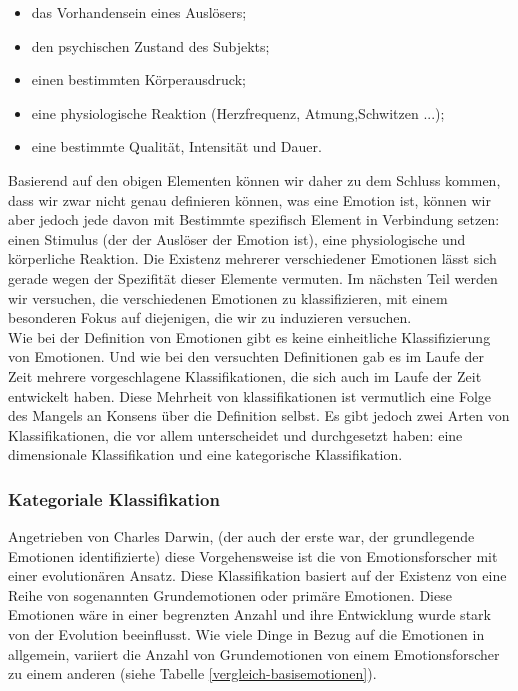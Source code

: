 \begin{itemize} \setlength\itemsep{-0.15cm}
  \item das Vorhandensein eines Ausl{\"o}sers;
  \item den psychischen Zustand des Subjekts;
  \item einen bestimmten K{\"o}rperausdruck;
  \item eine physiologische Reaktion (Herzfrequenz, Atmung,Schwitzen ...);
  \item eine bestimmte Qualit{\"a}t, Intensit{\"a}t und Dauer.
\end{itemize}


Basierend auf den obigen Elementen k{\"o}nnen wir daher zu dem Schluss kommen, dass wir zwar nicht genau definieren k{\"o}nnen, was eine Emotion ist, k{\"o}nnen wir aber jedoch jede davon mit Bestimmte spezifisch  Element in Verbindung setzen: einen Stimulus (der der Ausl{\"o}ser der Emotion ist), eine physiologische und k{\"o}rperliche Reaktion. 
Die Existenz mehrerer verschiedener Emotionen l{\"a}sst sich gerade wegen der Spezifit{\"a}t dieser Elemente vermuten. 
Im n{\"a}chsten Teil werden wir versuchen, die verschiedenen Emotionen zu klassifizieren, mit einem besonderen Fokus auf diejenigen, die wir zu induzieren versuchen. \\


Wie bei der Definition von Emotionen gibt es keine einheitliche Klassifizierung von Emotionen. 
Und wie bei den versuchten Definitionen gab es im Laufe der Zeit mehrere vorgeschlagene Klassifikationen, die sich auch im Laufe der Zeit entwickelt haben. 
Diese Mehrheit von klassifikationen ist vermutlich eine Folge des Mangels an Konsens {\"u}ber die Definition selbst. 
Es gibt jedoch zwei Arten von Klassifikationen, die vor allem unterscheidet und durchgesetzt haben: eine dimensionale Klassifikation\cite{geslin13} und eine kategorische Klassifikation\cite{basic_emotions_theories}.




\subsubsection{Kategoriale Klassifikation} \label{kategoriale-klassifikation}

Angetrieben von Charles Darwin, (der auch der erste war, der grundlegende Emotionen identifizierte) diese Vorgehensweise ist die von Emotionsforscher  mit einer evolution{\"a}ren Ansatz. 
Diese Klassifikation basiert auf der Existenz von eine Reihe von sogenannten Grundemotionen oder prim{\"a}re Emotionen. 
Diese  Emotionen w{\"a}re in einer begrenzten Anzahl und ihre Entwicklung wurde stark von der Evolution  beeinflusst. 
Wie viele Dinge in Bezug auf die Emotionen in allgemein, variiert die Anzahl von Grundemotionen von einem Emotionsforscher zu einem anderen (siehe Tabelle \ref{vergleich-basisemotionen}).


